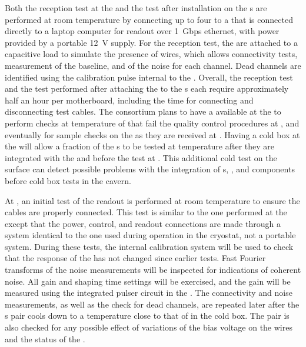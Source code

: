 Both the reception test at the  and the test after 
installation on the s are performed at room temperature 
by connecting up to four  to a  that is 
connected directly to a laptop computer for readout over 1~Gbps
ethernet, with power provided by a portable 12~V supply. For 
the reception test, the  are attached to a capacitive 
load to simulate the presence of wires, which allows connectivity 
tests, measurement of the baseline, and \rms of the noise for 
each channel. Dead channels are identified using the calibration 
pulse internal to the  . Overall, the reception 
test and the test performed after attaching the  to the 
s each require approximately half an hour per motherboard, 
including  the time for connecting and disconnecting test cables.
The  consortium plans to have a  available
at the  to perform checks at \lntwo temperature
of  that fail the quality control procedures at ,
and eventually for sample checks on the  as they are received
at . Having a cold box at the 
will allow a fraction of the s to be tested at
\lntwo temperature after they are integrated with the 
and  before the test at 
. This additional cold test on the surface can
detect possible problems with the integration of s, ,
and  components before cold
box tests in the  cavern.

At , an initial test of the readout is performed at room temperature to
ensure the cables are properly connected. This test is similar to the one
performed at the  except that the power, control, and readout
connections are made through a system identical to the one used during
operation in the cryostat, not a portable system.
During these tests, the internal calibration system will be used to check
that the response of the  has not changed since earlier
tests. Fast Fourier transforms of the noise measurements will be inspected
for indications of coherent noise. All  gain and shaping time
settings will be exercised, and the gain will be measured using the
integrated pulser circuit in the  . 
The connectivity and noise measurements, as well as the check for dead
channels, are repeated later after the s pair cools down
to a temperature close to that of \lntwo in the cold box. The pair is also 
checked for any possible effect of variations of the bias voltage
on the  wires and the status of the .


